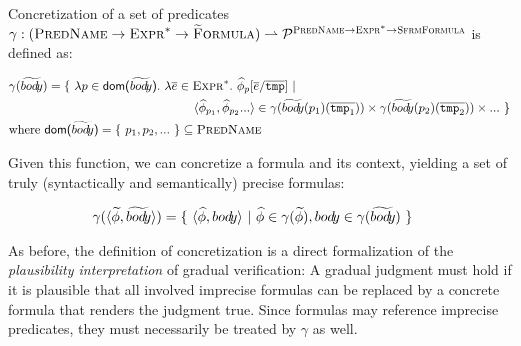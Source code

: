 \documentclass {llncs}
\begin{document}
\begin{definition}\label{def:idf-concretization-x}
	Concretization of a set of predicates $\gamma : (\textup{\textsc{PredName}} \rightarrow \textup{\textsc{Expr}}^* \rightarrow \textup{\textsc{\ensuremath{\widetilde{\text{F}}}ormula}}) \rightharpoonup \mathcal{P}^{\textup{\textsc{PredName}} \rightarrow \textup{\textsc{Expr}}^* \rightarrow \textup{\textsc{SfrmFormula}}}$ is defined as:
	\begin{small}
		\begin{align*}
		& \gamma(\grad{\bodyBareAny}) = \{~ \lambda p \in \dom{\grad{\bodyBareAny}}.~\lambda \overline{e} \in \setExpr^*.~\sphi_p[\overline{e}/\overline{\ttt{tmp}}] ~|~ \\
		& \hspace{15em} \langle \sphi_{p_1}, \sphi_{p_2} ... \rangle \in \gamma(\grad{\bodyBareAny}(p_1)(\overline{\ttt{tmp}_1})) \times \gamma(\grad{\bodyBareAny}(p_2)(\overline{\ttt{tmp}_2})) \times ... ~\} \\
		& \text{where } \dom{\grad{\bodyBareAny}} = \{~ p_1, p_2, ... ~\} \subseteq \setPredName
		\end{align*}
	\end{small}
	Given this function, we can concretize a formula and its context, yielding a set of truly (syntactically and semantically) precise formulas:
    \begin{small}
		\begin{align*}
		& \gamma(\langle \widetilde{\phi}, \widetilde{bod{\!y}} \rangle) = \{~ \langle \widehat{\phi}, bod{\!y} \rangle ~|~ \widehat{\phi} \in \gamma(\widetilde{\phi}), bod{\!y} \in \gamma(\widetilde{bod{\!y}}) ~\}
		\end{align*}
	\end{small}
\end{definition}

As before, the definition of concretization is a direct formalization of the \emph{plausibility interpretation} of gradual verification: A gradual judgment must hold if it is plausible that all involved imprecise formulas can be replaced by a concrete formula that renders the judgment true.
Since formulas may reference imprecise predicates, they must necessarily be treated by $\gamma$ as well.
\end{document}

